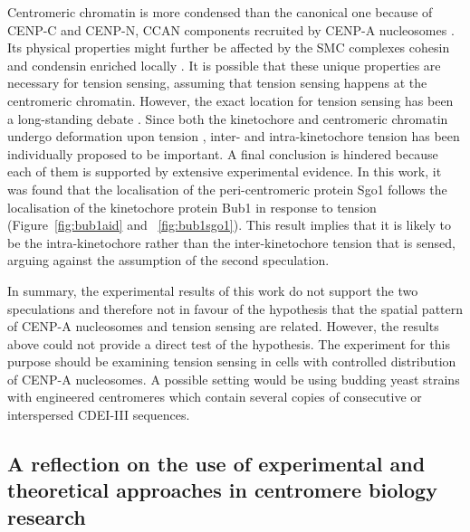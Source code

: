 Centromeric chromatin is more condensed than the canonical one because of CENP-C and CENP-N, CCAN components recruited by CENP-A nucleosomes \citep{Geiss2014, Panchenko2011, Zhou2022}. Its physical properties might further be affected by the SMC complexes cohesin and condensin enriched locally \citep{Verzijlbergen2014, Haase2012Bub1Dynamics, Paldi2020ConvergentPericentromeres}. It is possible that these unique properties are necessary for tension sensing, assuming that tension sensing happens at the centromeric chromatin. However, the exact location for tension sensing has been a long-standing  debate \citep{McVey2021AuroraSegregation}. Since both the kinetochore and centromeric chromatin undergo deformation upon tension \citep{Goshima2000EstablishingYeast, Roscioli2020}, inter- and intra-kinetochore tension has been individually proposed to be important. A final conclusion is hindered because each of them is supported by extensive experimental evidence. In this work, it was found that the localisation of the peri-centromeric protein Sgo1 follows the localisation of the kinetochore protein Bub1 in response to tension (Figure~\ref{fig:bub1aid} and ~\ref{fig:bub1sgo1}). This result implies that it is likely to be the intra-kinetochore rather than the inter-kinetochore tension that is sensed, arguing against the assumption of the second speculation. 

In summary, the experimental results of this work do not support the two speculations and therefore not in favour of the hypothesis that the spatial pattern of CENP-A nucleosomes and tension sensing are related. However, the results above could not provide a direct test of the hypothesis. The experiment for this purpose should be examining tension sensing in cells with controlled distribution of CENP-A nucleosomes. A possible setting would be using budding yeast strains with engineered centromeres which contain several copies of consecutive or interspersed CDEI-III sequences. 

\subsection{A reflection on the use of experimental and theoretical approaches in centromere biology research}

